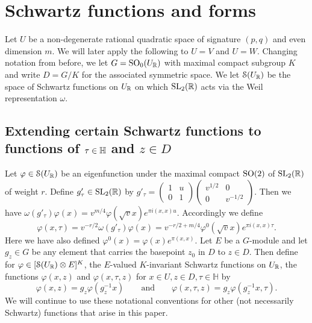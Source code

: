 \section{Schwartz functions and forms}

Let $U$ be a non-degenerate rational quadratic space of  signature $(p,q)$ and even dimension $m$. We will later apply the following to $U=V$ and $U=W$. Changing notation from before, we let $G = \operatorname{SO}_0(U_{\mathbb{R}})$ with maximal compact subgroup $K$ and write $D=G/K$ for the associated symmetric space. We let $\mathcal{S}(U_{\mathbb{R}})$ be the space of Schwartz functions on $U_{\mathbb{R}}$ on which $\operatorname{SL}_2(\mathbb{R})$ acts via the Weil representation $\omega$.

\subsection{Extending certain Schwartz functions to functions of $\tau \in \mathbb{H}$ and $z\in D$}\label{conventions}

Let $\varphi \in \mathcal{S}(U_{\mathbb{R}})$ be an eigenfunction under the maximal compact $\operatorname{SO}(2)$ of $\operatorname{SL}_2(\mathbb{R})$ of
weight $r$. Define $g'_{\tau} \in \operatorname{SL}_2(\mathbb{R})$
by $g'_{\tau} = \left(
\begin{smallmatrix}1&u\\0&1\end{smallmatrix} \right) \left(
\begin{smallmatrix}v^{1/2}&0\\0&v^{-1/2}\end{smallmatrix} \right)$.
Then we have $ \omega(g'_{\tau}) \varphi (x)= v^{m/4} \varphi(\sqrt{v}x) e^{\pi i (x,x)u}$.
Accordingly we define 
\begin{equation}\label{group-tau}
\varphi(x,\tau)  = v^{-r/2} \omega(g'_{\tau}) \varphi
(x)  = v^{-r/2+m/4} \varphi^0(\sqrt{v}x) e^{\pi i (x,x)\tau}.
\end{equation}
Here we have also defined $\varphi^0(x) = \varphi(x) e^{\pi (x,x)}$. Let $E$ be a $G$-module and let $g_z \in G$ be any element that carries the basepoint $z_0$ in $D$ to $z \in D$. Then define for $\varphi \in [\mathcal{S}(U_{\mathbb{R}}) \otimes E]^K$, the $E$-valued $K$-invariant Schwartz functions on $U_{\mathbb{R}}$, the functions $\varphi(x,z)$ and $\varphi(x,\tau,z)$ for $x \in U, z \in D, \tau \in \mathbb{H}$ by
\[
\varphi(x,z) =g_z \varphi(g_z^{-1}x) \qquad  \text{and} \qquad  \varphi(x,\tau,z) = g_z\varphi(g_z^{-1}x,\tau).
\]
We will continue to use these notational conventions for other (not necessarily Schwartz) functions that arise in this paper.


